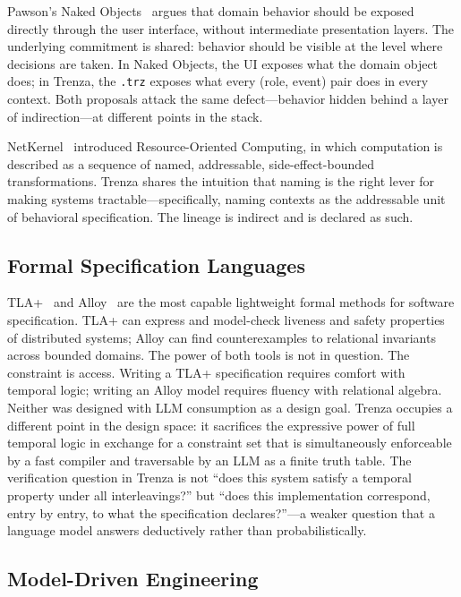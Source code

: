 Pawson's Naked Objects~\cite{pawson2002nakedobj} argues that domain behavior
should be exposed directly through the user interface, without intermediate
presentation layers. The underlying commitment is shared: behavior should be
visible at the level where decisions are taken. In Naked Objects, the UI exposes
what the domain object does; in Trenza, the \texttt{.trz} exposes what every
(role, event) pair does in every context. Both proposals attack the same
defect---behavior hidden behind a layer of indirection---at different points in
the stack.

NetKernel~\cite{rodgers2006netkernel} introduced Resource-Oriented Computing,
in which computation is described as a sequence of named, addressable,
side-effect-bounded transformations. Trenza shares the intuition that naming is
the right lever for making systems tractable---specifically, naming contexts as
the addressable unit of behavioral specification. The lineage is indirect and is
declared as such.

\subsection{Formal Specification Languages}

TLA+~\cite{lamport2002tla} and Alloy~\cite{jackson2006alloy} are the most
capable lightweight formal methods for software specification. TLA+ can express
and model-check liveness and safety properties of distributed systems; Alloy
can find counterexamples to relational invariants across bounded domains. The
power of both tools is not in question. The constraint is access. Writing a
TLA+ specification requires comfort with temporal logic; writing an Alloy model
requires fluency with relational algebra. Neither was designed with LLM
consumption as a design goal. Trenza occupies a different point in the design
space: it sacrifices the expressive power of full temporal logic in exchange for
a constraint set that is simultaneously enforceable by a fast compiler and
traversable by an LLM as a finite truth table. The verification question in
Trenza is not ``does this system satisfy a temporal property under all
interleavings?'' but ``does this implementation correspond, entry by entry, to
what the specification declares?''---a weaker question that a language model
answers deductively rather than probabilistically.

\subsection{Model-Driven Engineering}

